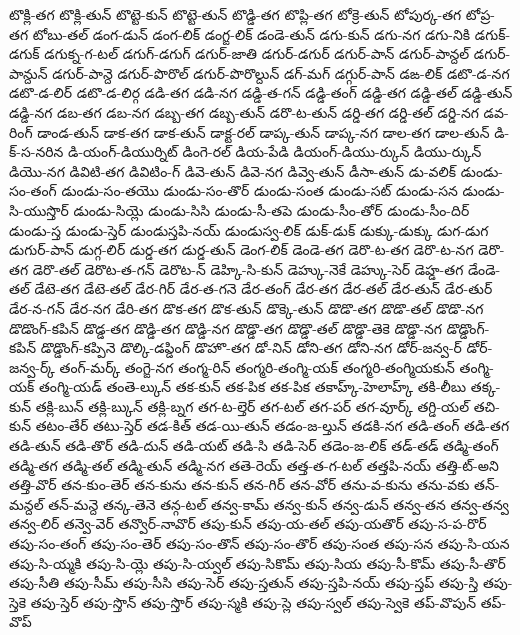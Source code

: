 {టొక్లి-తగ
టొక్లి-తున్
టొట్టె-కున్
టొట్టె-తున్
టొడ్డి-తగ
టొప్లి-తగ
టోక్రె-తున్
టోపుర్క-తగ
టోప్ర-తగ
టోబు-తల్
డంగ-డున్
డంగ-లిక్
డంగ్ఙ-లిక్
డండె-తున్
డగు-కున్
డగు-నగ
డగు-నికి
డగుక్-డగుక్
డగుక్న-గ-టల్
డగుగ్-డగుగ్
డగుర్-జాతి
డగుర్-డగుర్
డగుర్-పాన్
డగుర్-పాన్దల్
డగుర్-పాన్దున్
డగుర్-పాన్దె
డగుర్-పొరొల్
డగుర్-పొరొల్దున్
డగ్-మగ్
డగ్గుర్-పాన్
డఙ-లిక్
డటొ-డ-నగ
డటొ-డ-లిర్
డటొ-డ-లిర్గ
డడి-తగ
డడి-నగ
డడ్డి-త-గన్
డడ్డి-తంగ్
డడ్డి-తగ
డడ్డి-తల్
డడ్డి-తున్
డడ్డి-నగ
డబ-తగ
డబ-నగ
డబ్బ-తగ
డబ్బ-తున్
డరొ-ట-తున్
డర్డి-తగ
డర్డి-తల్
డర్డి-నగ
డవ-రింగ్
డాండ-తున్
డాక-తగ
డాక-తున్
డాక్ట-రల్
డాప్క-తున్
డాప్క-నగ
డాల-తగ
డాల-తున్
డి-క్-స-నరిన
డి-యంగ్-డియుర్నిట్
డింగె-రల్
డియ-పేడి
డియంగ్-డియు-ర్కున్
డియు-ర్కున్
డియొ-నగ
డివిటి-తగ
డివిటిం-గ్
డివె-తున్
డివె-నగ
డివ్వె-తున్
డీసా-తున్
డు-వలిక్
డుండు-సం-తంగ్
డుండు-సం-తయొ
డుండు-సం-తొర్
డుండు-సంత
డుండు-సట్
డుండు-సన
డుండు-సి-యుస్తొర్
డుండు-సియ్లె
డుండు-సిసి
డుండు-సీ-తపె
డుండు-సీం-తోర్
డుండు-సీం-దిర్
డుండు-స్త
డుండు-స్తెర్
డుండుస్తపి-నయ్
డుండుస్వ-లిక్
డుక్-డుక్
డుక్కు-డుక్కు
డుగ-డుగ
డుగుర్-పాన్
డుగ్గ-లిర్
డుర్డ-తగ
డుర్డ-తున్
డెంగ-లిక్
డెండె-తగ
డెరొ-ట-తగ
డెరొ-ట-నగ
డెరొ-తగ
డెరొ-తల్
డెరొట-త-గన్
డెరొట-న్
డెహ్కి-సి-కున్
డెహ్కు-నెకే
డెహ్కు-సెర్
డెహ్డ-తగ
డేండె-తల్
డేటె-తగ
డేటె-తల్
డేర-గిర్
డేర-త-గనె
డేర-తంగ్
డేర-తగ
డేర-తల్
డేర-తున్
డేర-తుర్
డేర-న-గన్
డేర-నగ
డేరి-తగ
డొక-తగ
డొక-తున్
డొక్కె-తున్
డొడొ-తగ
డొడొ-తల్
డొడొ-నగ
డొడొంగ్-కపిన్
డొడ్డ-తగ
డొడ్డి-తగ
డొడ్డి-నగ
డొడ్డొ-తగ
డొడ్డొ-తల్
డొడ్డొ-తెకె
డొడ్డొ-నగ
డొడ్డొంగ్-కపిన్
డొడ్డొంగ్-కప్పినె
డొల్కి-డప్డింగ్
డొహొ-తగ
డో-నిన్
డోని-తగ
డోని-నగ
డోర్-జన్వ-ర్
డోర్-జన్వ-ర్క్
తంగ్-మర్క్
తంగ్ఙె-నగ
తంగ్మ-రిన్
తంగ్మరి-తంగ్మి-యక్
తంగ్మరి-తంగ్మియకున్
తంగ్మి-యక్
తంగ్మి-యడ్
తంతె-ల్కున్
తక-కున్
తక-పిక
తక-పిక
తకాహ్క్-హెలాహ్క్
తకి-లీబు
తక్క-కున్
తక్లి-బున్
తక్లి-బ్కున్
తక్లి-బ్నగ
తగ-ట-ల్తెర్
తగ-టల్
తగ-పర్
తగ-వూర్క్
తగ్డి-యల్
తచి-కున్
తటం-తేర్
తటు-స్తెర్
తడ-కిత్
తడ-యి-తున్
తడం-జ-ల్తున్
తడకి-నగ
తడి-తంగ్
తడి-తగ
తడి-తున్
తడి-తొర్
తడి-దున్
తడి-యట్
తడి-సి
తడి-సెర్
తడెం-జ-లిక్
తడ్-తడ్
తడ్మి-తంగ్
తడ్మి-తగ
తడ్మి-తల్
తడ్మి-తున్
తడ్మి-నగ
తతె-రెయ్
తత్త-త-గ-టల్
తత్తపి-నయ్
తత్తి-ట్-అని
తత్తి-వొర్
తన-కుం-తెర్
తన-కును
తన-కున్
తన-గిర్
తన-వోర్
తను-వ-కును
తను-వకు
తన్-మన్దల్
తన్-మన్దె
తన్క-తెనె
తన్గ-టల్
తన్వ-కామ్
తన్వ-కున్
తన్వ-డున్
తన్వ-తన
తన్వ-తన్వ
తన్వ-లిర్
తన్వె-వెర్
తన్వొర్-నావొర్
తపు-కున్
తపు-య-తల్
తపు-యతొర్
తపు-స-ప-రొర్
తపు-సం-తంగ్
తపు-సం-తెర్
తపు-సం-తొన్
తపు-సం-తొర్
తపు-సంత
తపు-సన
తపు-సి-యన
తపు-సి-య్మకి
తపు-సి-య్లె
తపు-సి-య్వల్
తపు-సికొమ్
తపు-సియ
తపు-సీ-కొమ్
తపు-సీ-తొర్
తపు-సీతి
తపు-సీమ్
తపు-సీసి
తపు-సెర్
తపు-స్తతున్
తపు-స్తపి-నయ్
తపు-స్తప్
తపు-స్తి
తపు-స్తెకె
తపు-స్తెర్
తపు-స్తొన్
తపు-స్తొర్
తపు-స్మకి
తపు-స్లె
తపు-స్వల్
తపు-స్వెకె
తప్-వొపున్
తప్-వొప్
}
